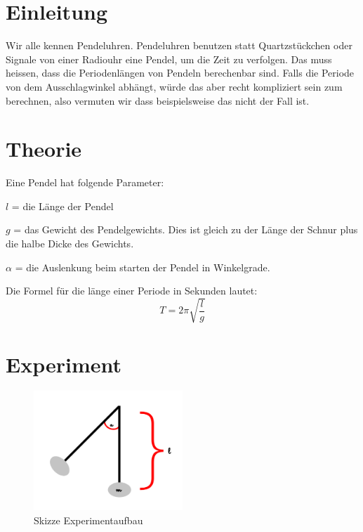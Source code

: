 \documentclass[12pt, a4paper, twoside]{article}
\begin{document}
\maketitlepage



\section{Einleitung}
Wir alle kennen Pendeluhren.
Pendeluhren benutzen statt Quartzstückchen oder Signale von einer Radiouhr eine Pendel, um die Zeit zu verfolgen.
Das muss heissen, dass die Periodenlängen von Pendeln berechenbar sind.
Falls die Periode von dem Ausschlagwinkel abhängt, würde das aber recht kompliziert sein zum berechnen, also vermuten wir dass beispielsweise das nicht der Fall ist.

\section{Theorie}
Eine Pendel hat folgende Parameter:
\begin{list}{-}{}
  \item $l$ = die Länge der Pendel
  \item $g$ = das Gewicht des Pendelgewichts. Dies ist gleich zu der Länge der Schnur plus die halbe Dicke des Gewichts.
  \item $\alpha$ = die Auslenkung beim starten der Pendel in Winkelgrade.
\end{list}

Die Formel für die länge einer Periode in Sekunden lautet:
$$T=2\pi \sqrt{\frac{l}{g}}$$
\cite{FoTa}

\section{Experiment}
\begin{figure} [ht]
  \centering
  \includegraphics[width=0.5\textwidth]{Experimentaufbau.png}
  \caption{Skizze Experimentaufbau}
  \label{fig:experimentaufbau}
\end{figure}
\end{document}
